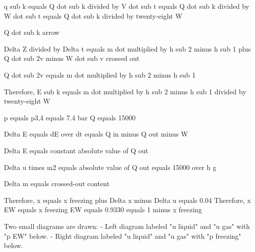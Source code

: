 q sub k equals Q dot sub k divided by V dot sub t equals Q dot sub k divided by W dot sub t equals Q dot sub k divided by twenty-eight W  

Q dot sub k arrow  

Delta Z divided by Delta t equals m dot multiplied by h sub 2 minus h sub 1 plus Q dot sub 2v minus W dot sub v crossed out  

Q dot sub 2v equals m dot multiplied by h sub 2 minus h sub 1  

Therefore, E sub k equals m dot multiplied by h sub 2 minus h sub 1 divided by twenty-eight W

p equals p3,4 equals 7.4 bar  
Q equals 15000  

Delta E equals dE over dt equals Q in minus Q out minus W  

Delta E equals constant absolute value of Q out  

Delta u times m2 equals absolute value of Q out equals 15000 over h g  

Delta m equals crossed-out content  

Therefore, x equals x freezing plus Delta x minus Delta u equals 0.04  
Therefore, x EW equals x freezing EW equals 0.9330 equals 1 minus x freezing  

Two small diagrams are drawn:  
- Left diagram labeled "u liquid" and "u gas" with "p EW" below.  
- Right diagram labeled "u liquid" and "u gas" with "p freezing" below.